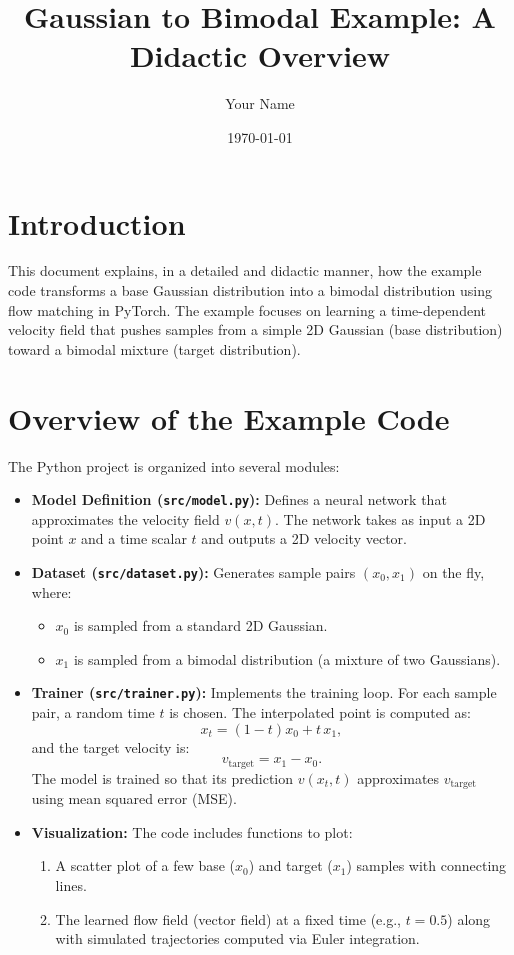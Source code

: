 \documentclass[12pt,a4paper]{article}
\title{Gaussian to Bimodal Example: A Didactic Overview}
\author{Your Name}
\date{\today}
\begin{document}
\maketitle

\tableofcontents
\newpage

\section{Introduction}

This document explains, in a detailed and didactic manner, how the example code transforms a base Gaussian distribution into a bimodal distribution using flow matching in PyTorch. The example focuses on learning a time-dependent velocity field that pushes samples from a simple 2D Gaussian (base distribution) toward a bimodal mixture (target distribution).

\section{Overview of the Example Code}

The Python project is organized into several modules:
\begin{itemize}
    \item \textbf{Model Definition (\texttt{src/model.py}):}  
    Defines a neural network that approximates the velocity field \( v(x,t) \). The network takes as input a 2D point \( x \) and a time scalar \( t \) and outputs a 2D velocity vector.
    
    \item \textbf{Dataset (\texttt{src/dataset.py}):}  
    Generates sample pairs \((x_0,x_1)\) on the fly, where:
    \begin{itemize}
        \item \( x_0 \) is sampled from a standard 2D Gaussian.
        \item \( x_1 \) is sampled from a bimodal distribution (a mixture of two Gaussians).
    \end{itemize}
    
    \item \textbf{Trainer (\texttt{src/trainer.py}):}  
    Implements the training loop. For each sample pair, a random time \( t \) is chosen. The interpolated point is computed as:
    \[
    x_t = (1-t)x_0 + t\,x_1,
    \]
    and the target velocity is:
    \[
    v_{\text{target}} = x_1 - x_0.
    \]
    The model is trained so that its prediction \( v(x_t,t) \) approximates \( v_{\text{target}} \) using mean squared error (MSE).
    
    \item \textbf{Visualization:}  
    The code includes functions to plot:
    \begin{enumerate}
        \item A scatter plot of a few base (\( x_0 \)) and target (\( x_1 \)) samples with connecting lines.
        \item The learned flow field (vector field) at a fixed time (e.g., \( t=0.5 \)) along with simulated trajectories computed via Euler integration.
    \end{enumerate}
\end{itemize}
\end{document}
